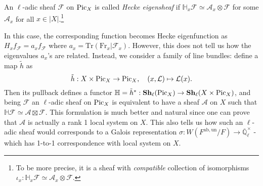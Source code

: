 \begin{definition} An $\ell$-adic sheaf $\mathcal{F}$ on $\operatorname{\mathrm{Pic}}_X$ is called \emph{Hecke eigensheaf} if
$\mathbb{H}_{x}\mathcal{F} \simeq \mathcal{A}_{x} \otimes \mathcal{F}$ for some $\mathcal{A}_{x}$ for all $x\in |X|$.\footnote{To be more precise, it is a sheaf with \emph{compatible} collection of isomorphisms $\iota_{x}: \mathbb{H}_{x}\mathcal{F} \simeq \mathcal{A}_{x}\otimes \mathcal{F}$.}
\end{definition}
In this case, the corresponding function becomes Hecke eigenfunction as $H_{x}f_{\mathcal{F}} = a_{x}f_{\mathcal{F}}$ where $a_{x} = \mathrm{Tr}(\mathrm{Fr}_{x}|\mathcal{F}_x)$.
However, this does not tell us how the eigenvalues $a_{x}$'s are related.
Instead, we consider a family of line bundles: define a map $\tilde{h}$ as 
$$
\tilde{h}: X \times \operatorname{\mathrm{Pic}}_X \to \operatorname{\mathrm{Pic}}_X, \quad (x, \mathcal{L}) \mapsto \mathcal{L}(x).
$$
Then its pullback defines a functor $\mathbb{H} = \tilde{h}^{*}: \mathbf{Sh}_{\ell}(\operatorname{\mathrm{Pic}}_X) \to \mathbf{Sh}_{\ell}(X \times \operatorname{\mathrm{Pic}}_X)$, and being $\mathcal{F}$ an $\ell$-adic sheaf
on $\operatorname{\mathrm{Pic}}_X$ is equivalent to have a sheaf $\mathcal{A}$ on $X$ such that $\mathbb{H}\mathcal{F} \simeq \mathcal{A} \boxtimes \mathcal{F}$.
This formulation is much better and natural since one can prove that $\mathcal{A}$ is actually a rank 1 local system on $X$.
This also tells us how such an $\ell$-adic sheaf would corresponds to a Galois representation
$\sigma: W(F^{\mathrm{ab, un}}/F) \to \overline{\mathbb{Q}}_{\ell}^{\times}$ - which has 1-to-1 correspondence with local system on $X$.

